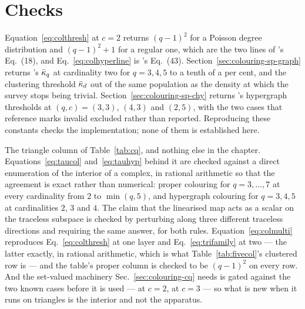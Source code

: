 \section{Checks}
\label{sec:colouring-checks}

Equation~\eqref{eq:colthresh} at $c=2$ returns $(q-1)^{2}$ for a Poisson degree
distribution and $(q-1)^{2}+1$ for a regular one, which are the two lines of
\citeauthor{zdeborova2007}'s Eq.~(18), and Eq.~\eqref{eq:colhyperline} is
\citeauthor{gabrie2017}'s Eq.~(43). Section~\ref{sec:colouring-sp-graph}
returns \citeauthor{mulet2002}'s $\bar\kappa_{q}$ at cardinality two for $q=3,4,5$ to a
tenth of a per cent, and the clustering threshold $\bar\kappa_{d}$ out of the same
population as the density at which the survey stops being trivial.
Section~\ref{sec:colouring-sp-chy} returns \citeauthor{gabrie2017}'s hypergraph
thresholds at $(q,c)=(3,3)$, $(4,3)$ and $(2,5)$, with the two cases that
reference marks invalid excluded rather than reported. Reproducing these
constants checks the implementation; none of them is established here.

The triangle column of Table~\ref{tab:cq}, and nothing else in the chapter.
Equations~\eqref{eq:taucol} and~\eqref{eq:tauhyp} behind it are checked against a
direct enumeration of the interior of a complex, in rational arithmetic so that
the agreement is exact rather than numerical: proper colouring for
$q=3,\dots,7$ at every cardinality from $2$ to $\min(q,5)$, and hypergraph
colouring for $q=3,4,5$ at cardinalities $2$, $3$ and $4$. The claim that the
linearised map acts as a scalar on the traceless subspace is checked by
perturbing along three different traceless directions and requiring the same
answer, for both rules. Equation~\eqref{eq:colmulti} reproduces
Eq.~\eqref{eq:colthresh} at one layer and Eq.~\eqref{eq:trifamily} at two ---
the latter exactly, in rational arithmetic, which is what
Table~\ref{tab:fivecol}'s clustered row is --- and the table's proper column is
checked to be $(q-1)^{2}$ on every row. And the set-valued machinery Sec.~\ref{sec:colouring-cq}
needs is gated against the two known cases before it is used ---
\citeauthor{mulet2002} at $c=2$, \citeauthor{gabrie2017} at $c=3$ --- so what is
new when it runs on triangles is the interior and not the apparatus.

